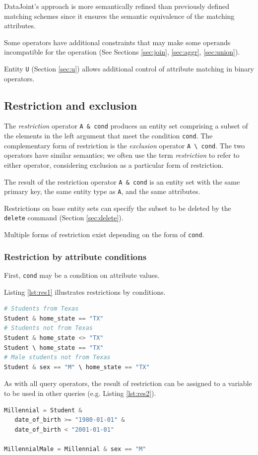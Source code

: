\documentclass[letter,10pt]{article}
\newcommand{\datajoint}{DataJoint\xspace}
\begin{document}
\datajoint's approach is more semantically refined than previously defined matching schemes since it ensures the semantic equivalence of the matching attributes.

Some operators have additional constraints that may make some operands incompatible for the operation (See Sections \ref{sec:join}, \ref{sec:aggr}, \ref{sec:union}).

Entity \lstinline$U$ (Section \ref{sec:u}) allows additional control of attribute matching in binary operators.

\subsection{Restriction and exclusion}\label{sec:restrict}
The \emph{restriction} operator \lstinline$A & cond$ produces an entity set comprising a subset of the elements in the left argument that meet the condition \lstinline$cond$. 
The complementary form of restriction is the \emph{exclusion} operator \lstinline$A \ cond$.
The two operators have similar semantics; we often use the term \emph{restriction} to refer to either  operator, considering exclusion as a particular form of restriction.

The result of the restriction operator \lstinline$A & cond$ is an entity set with the same primary key, the same entity type as \lstinline$A$, and the same attributes.

Restrictions on base entity sets can specify the subset to be deleted by the \lstinline$delete$ command (Section \ref{sec:delete}).

Multiple forms of restriction exist depending on the form of \lstinline$cond$.

\subsubsection{Restriction by attribute conditions}
First, \lstinline$cond$ may be a condition on attribute values.  

Listing \ref{lst:res1} illustrates restrictions by conditions.
\begin{lstlisting}[language=Python, caption={Restrictions by attribute conditions.}, label={lst:res1}]
# Students from Texas
Student & home_state == "TX"
# Students not from Texas
Student & home_state <> "TX"
Student \ home_state == "TX"
# Male students not from Texas
Student & sex == "M" \ home_state == "TX"
\end{lstlisting}

As with all query operators, the result of restriction can be assigned to a variable to be used in other queries (e.g. Listing \ref{lst:res2}).
\begin{lstlisting}[language=Python, caption={Assignment and use of relational variables.}, label={lst:res2}]
Millennial = Student & 
   date_of_birth >= "1980-01-01" & 
   date_of_birth < "2001-01-01"

MillennialMale = Millennial & sex == "M"
\end{lstlisting}
\end{document}
